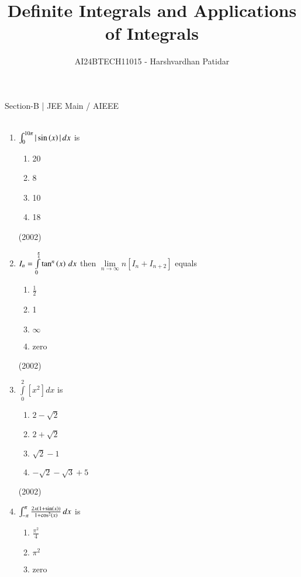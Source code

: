 \documentclass[journal,12pt,twocolumn]{IEEEtran}
\theoremstyle{remark}
\begin{document}

\vspace{3cm}

\title{Definite Integrals and Applications of Integrals}
\author{AI24BTECH11015 - Harshvardhan Patidar}
\maketitle
\newpage
\bigskip

\renewcommand{\thefigure}{\theenumi}
\renewcommand{\thetable}{\theenumi}


Section-B | JEE Main / AIEEE \\ \\
\begin{enumerate}
	\item 
		$\int_0^{10\pi} | \sin \left(x\right)| \, dx$ is  
		\begin{enumerate}
			\item 20\item 8\item 10\item 18
		\end{enumerate} 
		\hfill (2002)
	\item
		$I_n = \int \limits_{0}^{\frac{\pi}{4}} \tan^n \left(x\right) \, dx$ then $\lim \limits_{n \to \infty} n[I_n + I_{n+2}]$ equals 
				\begin{enumerate}
					\item $\frac{1}{2}$
	 				\item 1
					\item $\infty$
					\item zero
	 			\end{enumerate}
				\hfill(2002)
	\item
		$ \int \limits_0^2 [x^2]dx $ is  
			\begin{enumerate}
				\item $2-\sqrt2$
				 \item $2+\sqrt2$
				\item $\sqrt2 - 1$
				\item $-\sqrt2 - \sqrt3 + 5$
			\end{enumerate}
			\hfill (2002)
	\item 
		$ \int_{-\pi}^{\pi} \frac{2x(1 + \sin \left(x\right))}{1+\cos^2 \left(x\right)} \, dx$ is
			\begin{enumerate}
					\item $\frac{\pi^2}{4}$
					\item $\pi^2$
					\item zero

\end{enumerate}
\end{enumerate}
\end{document}
